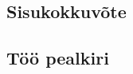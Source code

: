 \begin{otherlanguage}{estonian}
\chapter*{Sisukokkuv\~ote}

\section*{T\"o\"o pealkiri}

\end{otherlanguage}